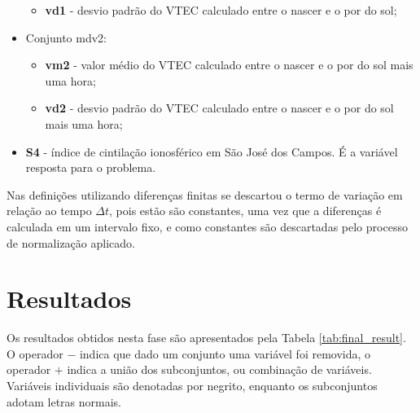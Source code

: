 \begin{itemize}
\begin{itemize}
\item {\bf vd1} - desvio padrão do VTEC calculado entre o nascer e o por do sol;
\end{itemize}
\item Conjunto mdv2:
\begin{itemize}
\item {\bf vm2} - valor médio do VTEC calculado entre o nascer e o por do sol mais uma hora;
\item {\bf vd2} - desvio padrão do VTEC calculado entre o nascer e o por do sol mais uma hora;
\end{itemize}
\item {\bf S4} - índice de cintilação ionosférico em São José dos Campos. É a variável resposta para o problema.
\end{itemize}

Nas definições utilizando diferenças finitas se descartou o termo de variação em relação ao tempo $\Delta t$, pois estão são constantes, uma vez que a diferenças é calculada em um intervalo fixo, e como constantes são descartadas pelo processo de normalização aplicado.

\section{Resultados}

Os resultados obtidos nesta fase são apresentados pela Tabela \ref{tab:final_result}. O operador $-$ indica que dado um conjunto uma variável foi removida, o operador $+$ indica a união dos subconjuntos, ou combinação de variáveis. Variáveis individuais são denotadas por negrito, enquanto os subconjuntos adotam letras normais.

